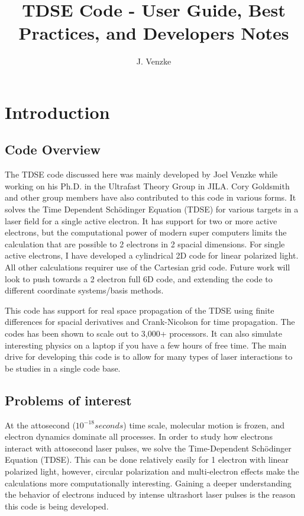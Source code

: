 \documentclass{article}
\title{TDSE Code - User Guide, Best Practices, and Developers Notes}
\author{J. Venzke}
\begin{document}
\maketitle

\tableofcontents
\newpage

\section{Introduction} %
\label{sec:introduction}
\subsection{Code Overview} %
\label{sub:code_overview}
The TDSE code discussed here was mainly developed by Joel Venzke while working on his Ph.D. in the Ultrafast Theory Group in JILA. Cory Goldsmith and other group members have also contributed to this code in various forms. It solves the Time Dependent Sch\"{o}dinger Equation (TDSE) for various targets in a laser field for a single active electron. It has support for two or more active electrons, but the computational power of modern super computers limits the calculation that are possible to 2 electrons in 2 spacial dimensions. For single active electrons, I have developed a cylindrical 2D code for linear polarized light. All other calculations requirer use of the Cartesian grid code. Future work will look to push towards a 2 electron full 6D code, and extending the code to different coordinate systems/basis methods.

This code has support for real space propagation of the TDSE using finite differences for spacial derivatives and Crank-Nicolson for time propagation. The codes has been shown to scale out to 3,000+ processors. It can also simulate interesting physics on a laptop if you have a few hours of free time. The main drive for developing this code is to allow for many types of laser interactions to be studies in a single code base.

\subsection{Problems of interest} %
\label{sub:problems_of_interest}
At the attosecond ($10^{-18} seconds$) time scale, molecular motion is frozen, and electron dynamics dominate all processes. In order to study how electrons interact with attosecond laser pulses, we solve the Time-Dependent Sch\"{o}dinger Equation (TDSE). This can be done relatively easily for 1 electron with linear polarized light, however, circular polarization and multi-electron effects make the calculations more computationally interesting. Gaining a deeper understanding the behavior of electrons induced by intense ultrashort laser pulses is the reason this code is being developed.
\end{document}
